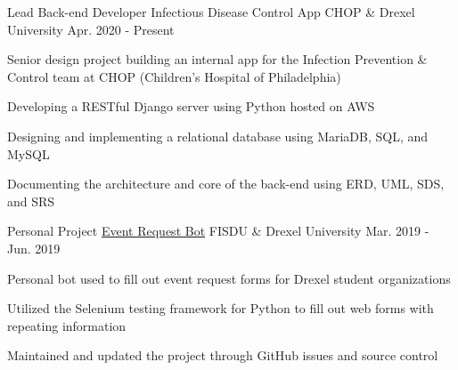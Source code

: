 

\begin{cventries}

  \cventry
    {Lead Back-end Developer} %
    {Infectious Disease Control App} %
    {CHOP \& Drexel University} %
    {Apr. 2020 - Present} %
    {
      \begin{cvitems} %
        \item Senior design project building an internal app for the Infection Prevention \& Control team at CHOP (Children's Hospital of Philadelphia)
        \item Developing a RESTful Django server using Python hosted on AWS
        \item Designing and implementing a relational database using MariaDB, SQL, and MySQL
        \item Documenting the architecture and core of the back-end using ERD, UML, SDS, and SRS
      \end{cvitems}
    }

  \cventry
    {Personal Project} %
    {\href{https://github.com/AbirRazzak/event-request-bot}{Event Request Bot}} %
    {FISDU \& Drexel University} %
    {Mar. 2019 - Jun. 2019} %
    {
      \begin{cvitems} %
        \item Personal bot used to fill out event request forms for Drexel student organizations
        \item Utilized the Selenium testing framework for Python to fill out web forms with repeating information
        \item Maintained and updated the project through GitHub issues and source control
      \end{cvitems}
    }


\end{cventries}
